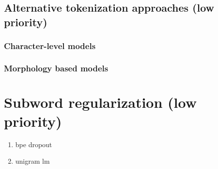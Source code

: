 









\subsection{Alternative tokenization approaches (low priority)}

\subsubsection{Character-level models}
\subsubsection{Morphology based models}

\section{Subword regularization (low priority)}

\begin{enumerate}
    \item bpe dropout
    \item unigram lm
\end{enumerate}

